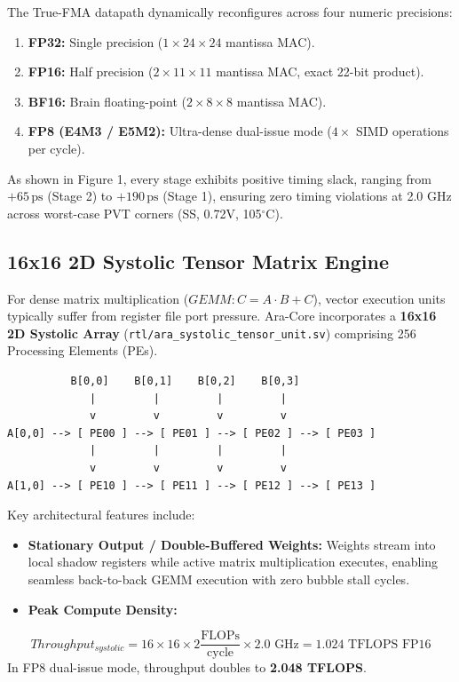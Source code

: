 \documentclass[journal,10pt,twocolumn]{IEEEtran}
\begin{document}
The True-FMA datapath dynamically reconfigures across four numeric precisions:
\begin{enumerate}
  \item \textbf{FP32:} Single precision ($1 \times 24 \times 24$ mantissa MAC).
  \item \textbf{FP16:} Half precision ($2 \times 11 \times 11$ mantissa MAC, exact 22-bit product).
  \item \textbf{BF16:} Brain floating-point ($2 \times 8 \times 8$ mantissa MAC).
  \item \textbf{FP8 (E4M3 / E5M2):} Ultra-dense dual-issue mode ($4 \times$ SIMD operations per cycle).
\end{enumerate}

As shown in Figure 1, every stage exhibits positive timing slack, ranging from $+65\,\text{ps}$ (Stage 2) to $+190\,\text{ps}$ (Stage 1), ensuring zero timing violations at 2.0 GHz across worst-case PVT corners (SS, 0.72V, 105$^\circ$C).

\subsection{16x16 2D Systolic Tensor Matrix Engine}

For dense matrix multiplication ($GEMM: C = A \cdot B + C$), vector execution units typically suffer from register file port pressure. Ara-Core incorporates a \textbf{16x16 2D Systolic Array} (\texttt{rtl/ara\_systolic\_tensor\_unit.sv}) comprising 256 Processing Elements (PEs).

\begin{footnotesize}\begin{verbatim}
          B[0,0]    B[0,1]    B[0,2]    B[0,3]
             |         |         |         |
             v         v         v         v
A[0,0] --> [ PE00 ] --> [ PE01 ] --> [ PE02 ] --> [ PE03 ]
             |         |         |         |
             v         v         v         v
A[1,0] --> [ PE10 ] --> [ PE11 ] --> [ PE12 ] --> [ PE13 ]
\end{verbatim}\end{footnotesize}

Key architectural features include:
\begin{itemize}
  \item \textbf{Stationary Output / Double-Buffered Weights:} Weights stream into local shadow registers while active matrix multiplication executes, enabling seamless back-to-back GEMM execution with zero bubble stall cycles.
  \item \textbf{Peak Compute Density:}
\end{itemize}
$$Throughput_{systolic} = 16 \times 16 \times 2 \frac{\text{FLOPs}}{\text{cycle}} \times 2.0 \text{ GHz} = 1.024 \text{ TFLOPS FP16}$$
In FP8 dual-issue mode, throughput doubles to \textbf{2.048 TFLOPS}.
\end{document}
